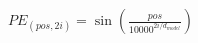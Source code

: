 \documentclass[preview]{standalone}
\begin{document}
\begin{align*}
PE_{(pos, 2i)} = \sin\left(\frac{pos}{10000^{2i/d_{model}}}\right)
\end{align*}
\end{document}
